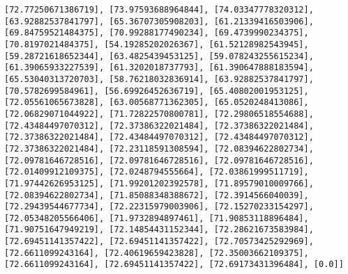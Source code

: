 \documentclass[11pt]{article}
\begin{document}
\begin{Verbatim}[commandchars=\\\{\}]
[72.77250671386719], [73.97593688964844], [74.03347778320312],
[63.92882537841797], [65.36707305908203], [61.21339416503906],
[69.84759521484375], [70.99288177490234], [69.4739990234375],
[70.8197021484375], [54.19285202026367], [61.52128982543945],
[59.28721618652344], [63.4825439453125], [59.078243255615234],
[61.39065933227539], [61.3202018737793], [61.390647888183594],
[65.53040313720703], [58.76218032836914], [63.92882537841797],
[70.5782699584961], [56.69926452636719], [65.40802001953125],
[72.05561065673828], [63.00568771362305], [65.0520248413086],
[72.06829071044922], [71.72822570800781], [72.29806518554688],
[72.43484497070312], [72.37386322021484], [72.37386322021484],
[72.37386322021484], [72.43484497070312], [72.43484497070312],
[72.37386322021484], [72.23118591308594], [72.08394622802734],
[72.09781646728516], [72.09781646728516], [72.09781646728516],
[72.01409912109375], [72.0248794555664], [72.03861999511719],
[71.97442626953125], [71.99201202392578], [71.89579010009766],
[72.08394622802734], [71.85088348388672], [72.3914566040039],
[72.29439544677734], [72.22315979003906], [72.15270233154297],
[72.05348205566406], [71.9732894897461], [71.90853118896484],
[71.90751647949219], [72.14854431152344], [72.28621673583984],
[72.69451141357422], [72.69451141357422], [72.70573425292969],
[72.6611099243164], [72.40619659423828], [72.35003662109375],
[72.6611099243164], [72.69451141357422], [72.69173431396484], [0.0]]
    \end{Verbatim}


    
    
    
\end{document}
